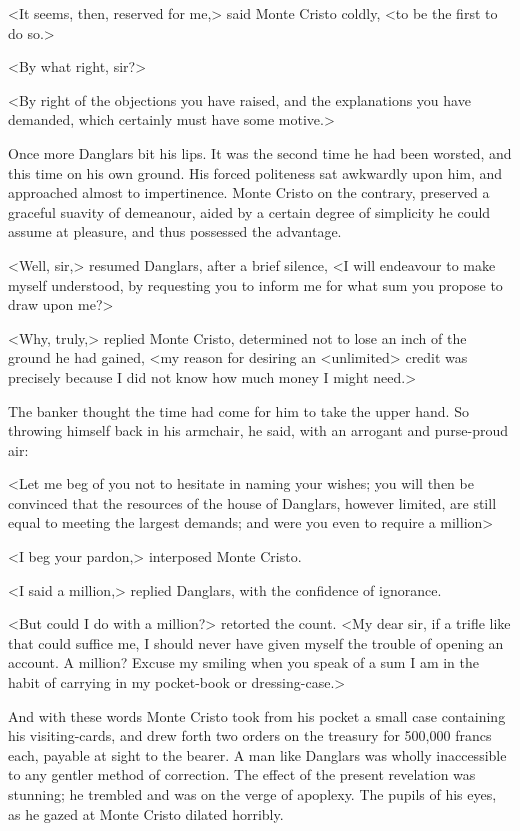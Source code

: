  <It seems, then, reserved for me,> said Monte Cristo coldly, <to be the first to do so.> 

 <By what right, sir?> 

 <By right of the objections you have raised, and the explanations you have demanded, which certainly must have some motive.> 

 Once more Danglars bit his lips. It was the second time he had been worsted, and this time on his own ground. His forced politeness sat awkwardly upon him, and approached almost to impertinence. Monte Cristo on the contrary, preserved a graceful suavity of demeanour, aided by a certain degree of simplicity he could assume at pleasure, and thus possessed the advantage. 

 <Well, sir,> resumed Danglars, after a brief silence, <I will endeavour to make myself understood, by requesting you to inform me for what sum you propose to draw upon me?> 

 <Why, truly,> replied Monte Cristo, determined not to lose an inch of the ground he had gained, <my reason for desiring an <unlimited> credit was precisely because I did not know how much money I might need.> 

 The banker thought the time had come for him to take the upper hand. So throwing himself back in his armchair, he said, with an arrogant and purse-proud air: 

 <Let me beg of you not to hesitate in naming your wishes; you will then be convinced that the resources of the house of Danglars, however limited, are still equal to meeting the largest demands; and were you even to require a million\longdash> 

 <I beg your pardon,> interposed Monte Cristo. 

 <I said a million,> replied Danglars, with the confidence of ignorance. 

 <But could I do with a million?> retorted the count. <My dear sir, if a trifle like that could suffice me, I should never have given myself the trouble of opening an account. A million? Excuse my smiling when you speak of a sum I am in the habit of carrying in my pocket-book or dressing-case.> 

 And with these words Monte Cristo took from his pocket a small case containing his visiting-cards, and drew forth two orders on the treasury for 500,000 francs each, payable at sight to the bearer. A man like Danglars was wholly inaccessible to any gentler method of correction. The effect of the present revelation was stunning; he trembled and was on the verge of apoplexy. The pupils of his eyes, as he gazed at Monte Cristo dilated horribly. 

